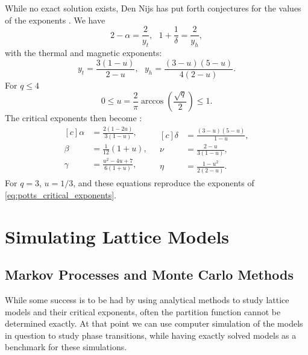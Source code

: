 \documentclass[11pt, a4paper]{report} %
\begin{document}
While no exact solution exists, Den Nijs has put forth conjectures for the values of the exponents \cite{nijs:1979}.
We have \cite{wu:1982}
\begin{equation}
	2 - \alpha = \frac{2}{y_t} ,\ \ \ 1 + \frac{1}{\delta} = \frac{2}{y_h},
\end{equation}
with the thermal and magnetic exponents:
\begin{equation}
	y_t = \frac{3(1-u)}{2-u},\ \ \ y_h = \frac{(3-u)(5-u)}{4(2-u)}.
\end{equation}
For \(q \leq 4\) \cite{wu:1982}
\begin{equation}
	0 \leq u = \frac{2}{\pi} \arccos(\frac{\sqrt{q}}{2}) \leq 1.
\end{equation}
The critical exponents then become \cite{wu:1982, baxter:1989}:
\begin{equation}
	\begin{aligned}[c]
		\alpha &= \frac{2(1-2u)}{3(1-u)}, \\
		\beta &= \frac{1}{12}(1 + u), \\
		\gamma &= \frac{u^2 -4u +7}{6(1+u)}, \\
	\end{aligned}
	\ \ \
	\begin{aligned}[c]
		\delta &= \frac{(3-u)(5-u)}{1-u}, \\
		\nu &= \frac{2-u}{3(1-u)}, \\
		\eta &= \frac{1-u^2}{2(2-u)}.
	\end{aligned}
\end{equation}
For \(q=3\), \(u=1/3\), and these equations reproduce the exponents of \cref{eq:potts_critical_exponents}.


\chapter{Simulating Lattice Models}

\section{Markov Processes and Monte Carlo Methods}
While some success is to be had by using analytical methods to study lattice models and their critical exponents, often the partition function cannot be determined exactly.
At that point we can use computer simulation of the models in question to study phase transitions, while having exactly solved models as a benchmark for these simulations.
\end{document}
